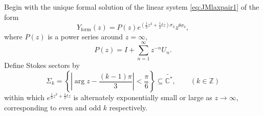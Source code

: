 \documentclass[a4paper,reqno]{amsart}
\numberwithin{equation}{section}
\newcommand{\Z}{\mathbb{Z}}
\numberwithin{equation}{section}
\begin{document}
Begin with the unique formal solution of the linear system \eqref{eq:JMlaxpair1} of the form
\begin{equation}\label{eq:formalsolPII}
    Y_{\text{form}}(z)=P(z)e^{(\frac{1}{3}z^3+\frac{1}{2}tz)\sigma_3}z^{\theta \sigma_3},
\end{equation}
where $P(z)$ is a power series around $z=\infty$,
\begin{equation}\label{eq:matrixPasymptoticPII}
    P(z)=I+\sum_{n=1}^\infty z^{-n}U_n.
\end{equation}
Define Stokes sectors by
\begin{equation*}
    \Sigma_k=\left\{\left|\arg z- \frac{(k-1)\pi}{3}\right|<\frac{\pi}{6}\right\}\subseteq \widetilde{\mathbb{C}^*}, \qquad (k \in \Z)
\end{equation*}
within which $e^{\frac{1}{3}z^3+\frac{1}{2}tz}$ is alternately exponentially small or large as $z\to \infty$, corresponding to even and odd $k$ respectively.
\end{document}
